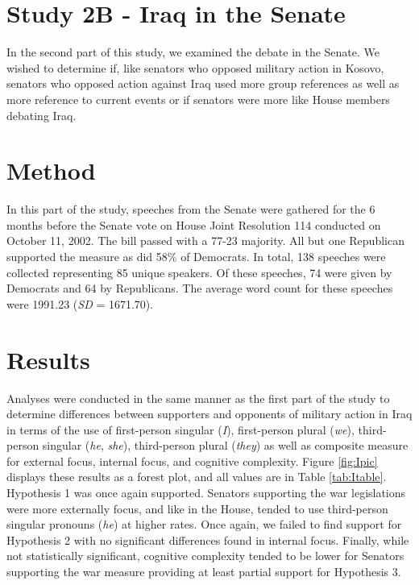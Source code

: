 \documentclass[english,,man,floatsintext]{apa6}
\begin{document}
\hypertarget{study-2b---iraq-in-the-senate}{%
\section{Study 2B - Iraq in the Senate}\label{study-2b---iraq-in-the-senate}}

In the second part of this study, we examined the debate in the Senate. We wished to determine if, like senators who opposed military action in Kosovo, senators who opposed action against Iraq used more group references as well as more reference to current events or if senators were more like House members debating Iraq.

\hypertarget{method-4}{%
\section{Method}\label{method-4}}

In this part of the study, speeches from the Senate were gathered for the 6 months before the Senate vote on House Joint Resolution 114 conducted on October 11, 2002. The bill passed with a 77-23 majority. All but one Republican supported the measure as did 58\% of Democrats. In total, 138 speeches were collected representing 85 unique speakers. Of these speeches, 74 were given by Democrats and 64 by Republicans. The average word count for these speeches were 1991.23 (\emph{SD} = 1671.70).

\hypertarget{results-3}{%
\section{Results}\label{results-3}}

Analyses were conducted in the same manner as the first part of the study to determine differences between supporters and opponents of military action in Iraq in terms of the use of first-person singular (\emph{I}), first-person plural (\emph{we}), third-person singular (\emph{he}, \emph{she}), third-person plural (\emph{they}) as well as composite measure for external focus, internal focus, and cognitive complexity. Figure \ref{fig:Ipic} displays these results as a forest plot, and all values are in Table \ref{tab:Itable}. Hypothesis 1 was once again supported. Senators supporting the war legislations were more externally focus, and like in the House, tended to use third-person singular pronouns (\emph{he}) at higher rates. Once again, we failed to find support for Hypothesis 2 with no significant differences found in internal focus. Finally, while not statistically significant, cognitive complexity tended to be lower for Senators supporting the war measure providing at least partial support for Hypothesis 3.
\end{document}
